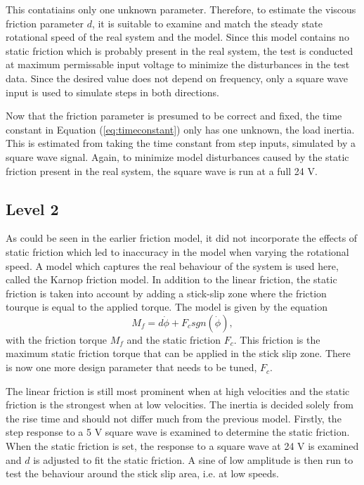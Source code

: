 \documentclass[12pt,a4paper]{article}
\begin{document}
This contatiains only one unknown parameter. Therefore, to estimate the viscous
friction parameter $d$, it is suitable to examine and match the steady state
rotational speed of the real system and the model. Since this model contains no
static friction which is probably present in the real system, the test is
conducted at maximum permissable input voltage to minimize the disturbances in
the test data. Since the desired value does not depend on frequency, only a
square wave input is used to simulate steps in both directions. \par
Now that the friction parameter is presumed to be correct and fixed, the time
constant in Equation (\ref{eq:timeconstant}) only has one unknown, the load
inertia. This is estimated from taking the time constant from step inputs,
simulated by a square wave signal. Again, to minimize model disturbances caused
by the static friction present in the real system, the square wave is run at a
full 24 V. 
\subsection*{Level 2}
\label{sub:level_2}
As could be seen in the earlier friction model, it did not incorporate the
effects of static friction which led to inaccuracy in the model when varying the
rotational speed. A model which captures the real behaviour of the system is
used here, called the Karnop friction model. In addition to the linear friction,
the static friction is taken into account by adding a stick-slip zone where the
friction tourque is equal to the applied torque. The model is given by the
equation
\begin{equation}
    \label{eq:karnop}
    M_f = d \dot{\phi} + F_c sgn(\dot{\phi}),
\end{equation}
with the friction torque $M_f$ and the static friction $F_c$. This friction is
the maximum static friction torque that can be applied in the stick slip zone.
There is now one more design parameter that needs to be tuned, $F_c$.
\par
The linear friction is still most prominent when at high velocities and the
static friction is the strongest when at low velocities. The inertia is decided
solely from the rise time and should not differ much from the previous model.
Firstly, the step response to a 5 V square wave is examined to determine the
static friction. When the static friction is set, the response to a square wave
at 24 V is examined and $d$ is adjusted to fit the static friction. A sine of
low amplitude is then run to test the behaviour around the stick slip area, i.e.
at low speeds.
\end{document}
